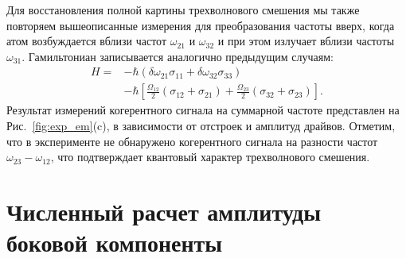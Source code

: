 Для восстановления полной картины трехволнового смешения мы также повторяем вышеописанные измерения для преобразования частоты вверх, когда атом возбуждается вблизи частот $\omega_{21}$ и $\omega_{32}$ и при этом излучает вблизи частоты $\omega_{31}$. Гамильтониан записывается аналогично предыдущим случаям: 
\begin{equation}
	\begin{aligned}
		H={}&-\hbar(\delta\omega_{21}\sigma_{11}+\delta\omega_{32}\sigma_{33})\\
		&-\hbar\left[\frac{\Omega_{12}}{2}(\sigma_{12}+\sigma_{21})+\frac{\Omega_{23}}{2}(\sigma_{32}+\sigma_{23})\right].
	\end{aligned}
\label{H3}
\end{equation}
Результат измерений когерентного сигнала на суммарной частоте представлен на Рис.~\ref{fig:exp_em}(c), в зависимости от отстроек и амплитуд драйвов. Отметим, что в эксперименте не обнаружено когерентного сигнала на разности частот $\omega_{23}-\omega_{12}$, что подтверждает квантовый характер трехволнового смешения. 
\section{Численный расчет амплитуды боковой компоненты}

